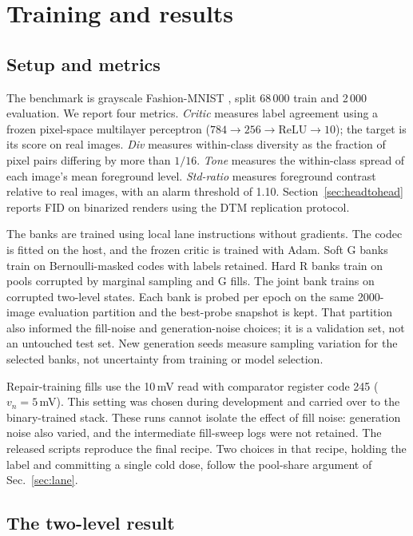 \documentclass[reprint,amsmath,amssymb,aps,nofootinbib]{revtex4-2}
\begin{document}
\section{Training and results}\label{sec:results}

\subsection{Setup and metrics}\label{sec:setup}

The benchmark is grayscale Fashion-MNIST \cite{xiao2017fashion},
split 68\,000 train and 2\,000 evaluation. We report four metrics. \emph{Critic} measures label agreement using a
frozen pixel-space multilayer perceptron
($784\to256\to\mathrm{ReLU}\to10$); the target is its score on real
images. \emph{Div} measures within-class diversity as the fraction of
pixel pairs differing by more than $1/16$. \emph{Tone} measures the
within-class spread of each image's mean foreground level.
\emph{Std-ratio} measures foreground contrast relative to real images,
with an alarm threshold of 1.10. Section~\ref{sec:headtohead} reports FID on binarized renders using
the DTM replication protocol.

The banks are trained using local lane instructions without gradients. The
codec is fitted on the host, and the frozen critic is trained with Adam. Soft G banks train on Bernoulli-masked codes with labels retained. Hard
R banks train on pools corrupted by marginal sampling and G fills. The
joint bank trains on corrupted two-level states. Each bank is probed per epoch on the same 2000-image evaluation
partition and the best-probe snapshot is kept. That partition also
informed the fill-noise and generation-noise choices; it is a
validation set, not an untouched test set. New generation seeds
measure sampling variation for the selected banks, not uncertainty
from training or model selection.

Repair-training fills use the 10\,mV read with comparator register
code 245 ($v_n=5$\,mV). This setting was chosen during development
and carried over to the binary-trained stack. These runs cannot isolate the effect of fill noise: generation noise
also varied, and the intermediate fill-sweep logs were not retained. The released scripts reproduce the final recipe.
Two choices in that recipe, holding the label and committing a single
cold dose, follow the pool-share argument of Sec.~\ref{sec:lane}.

\subsection{The two-level result}\label{sec:headline}
\end{document}
